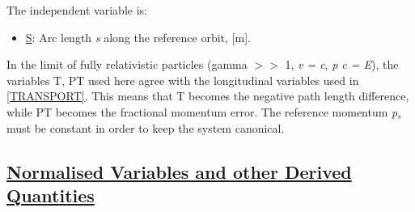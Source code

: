The independent variable is: 
\begin{itemize}
	\item \href{s}{S}: Arc length \textit{s} along the reference
          orbit, [m].   
\end{itemize} 

In the limit of fully relativistic particles (gamma $>$$>$ 1, \textit{v
  = c}, \textit{p c = E}), the variables T, PT used here agree with the
longitudinal variables used in
\href{bibliography.html#transport}{[TRANSPORT]}. This means that T
becomes the negative path length difference, while PT becomes the
fractional momentum error. The reference momentum \textit{p$_s$} must be
constant in order to keep the system canonical.  

\subsection{\href{normal}{Normalised Variables and other Derived Quantities}}
